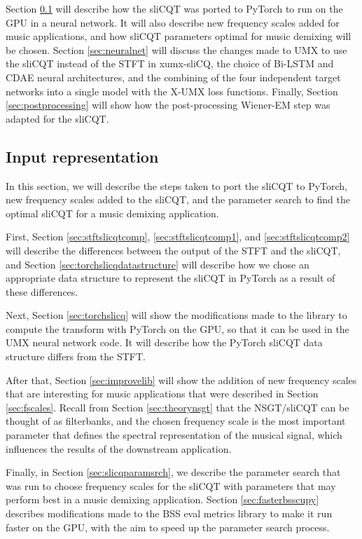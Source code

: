 \documentclass[report.tex]{subfiles}
\begin{document}
Section \ref{sec:inputrepresentation} will describe how the sliCQT was ported to PyTorch to run on the GPU in a neural network. It will also describe new frequency scales added for music applications, and how sliCQT parameters optimal for music demixing will be chosen. Section \ref{sec:neuralnet} will discuss the changes made to UMX to use the sliCQT instead of the STFT in xumx-sliCQ, the choice of Bi-LSTM and CDAE neural architectures, and the combining of the four independent target networks into a single model with the X-UMX loss functions. Finally, Section \ref{sec:postprocessing} will show how the post-processing Wiener-EM step was adapted for the sliCQT.

\subsection{Input representation}
\label{sec:inputrepresentation}

In this section, we will describe the steps taken to port the sliCQT to PyTorch, new frequency scales added to the sliCQT, and the parameter search to find the optimal sliCQT for a music demixing application.

First, Section \ref{sec:stftslicqtcomp}, \ref{sec:stftslicqtcomp1}, and \ref{sec:stftslicqtcomp2} will describe the differences between the output of the STFT and the sliCQT, and Section \ref{sec:torchslicqdatastructure} will describe how we chose an appropriate data structure to represent the sliCQT in PyTorch as a result of these differences.

Next, Section \ref{sec:torchslicq} will show the modifications made to the library to compute the transform with PyTorch on the GPU, so that it can be used in the UMX neural network code. It will describe how the PyTorch sliCQT data structure differs from the STFT.

After that, Section \ref{sec:improvelib} will show the addition of new frequency scales that are interesting for music applications that were described in Section \ref{sec:fscales}. Recall from Section \ref{sec:theorynsgt} that the NSGT/sliCQT can be thought of as filterbanks, and the chosen frequency scale is the most important parameter that defines the spectral representation of the musical signal, which influences the results of the downstream application.

Finally, in Section \ref{sec:slicqparamsrch}, we describe the parameter search that was run to choose frequency scales for the sliCQT with parameters that may perform best in a music demixing application. Section \ref{sec:fasterbsscupy} describes modifications made to the BSS eval metrics library to make it run faster on the GPU, with the aim to speed up the parameter search process.
\end{document}
